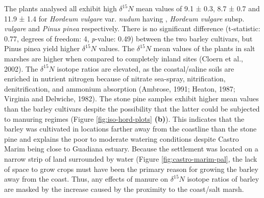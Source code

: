 \documentclass[review]{elsarticle} %
\begin{document}
The plants analysed all exhibit high \(\delta ^{15}N\) mean values of 9.1 ± 0.3\text{\textperthousand}, 8.7 ± 0.7\text{\textperthousand} and 11.9 ± 1.4\text{\textperthousand} for \emph{Hordeum vulgare} var. \emph{nudum} having , \emph{Hordeum vulgare} subsp. \emph{vulgare} and \emph{Pinus pinea} respectively. There is no significant difference (t-statistic: 0.77, degrees of freedom: 4, \emph{p}-value: 0.49) between the two barley cultivars, but Pinus pinea yield higher \(\delta ^{15}N\) values. The \(\delta ^{15}N\) mean values of the plants in salt marshes are higher when compared to completely inland sites (Cloern et al., 2002). The \(\delta ^{15}N\) isotope ratios are elevated, as the coastal/saline soils are enriched in nutrient nitrogen because of nitrate sea-spray, nitrification, denitrification, and ammonium absorption (Ambrose, 1991; Heaton, 1987; Virginia and Delwiche, 1982).
The stone pine samples exhibit higher mean values than the barley cultivars despite the possibility that the latter could be subjected to manuring regimes (Figure \ref{fig:iso-hord-plots} \textbf{(b)}). This indicates that the barley was cultivated in locations farther away from the coastline than the stone pine and explains the poor to moderate watering conditions despite Castro Marim being close to Guadiana estuary. Because the settlement was located on a narrow strip of land surrounded by water (Figure \ref{fig:castro-marim-pal}, the lack of space to grow crops must have been the primary reason for growing the barley away from the coast. Thus, any effects of manure on \(\delta ^{15}N\) isotope ratios of barley are masked by the increase caused by the proximity to the coast/salt marsh.

\begingroup\fontsize{7.5}{9.5}\selectfont
\end{document}
